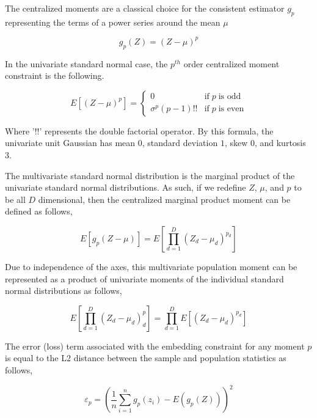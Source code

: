 \documentclass[10pt,twocolumn,letterpaper]{article}
\begin{document}
The centralized moments are a classical choice for the consistent estimator $g_p$ representing the terms of a power series around the mean $\mu$

\begin{equation}
	g_p(Z) = (Z - \mu)^p
\end{equation}

In the univariate standard normal case, the $p^{th}$ order centralized moment constraint is the following.

\begin{equation}
	E\left[ (Z-\mu)^p \right] = 
	\begin{cases} 
		0 &  \text{if} \; p \; \text{is odd} \\
		\sigma^p(p - 1)!! & \text{if} \; p \; \text{is even}
	\end{cases}
\end{equation}

Where '$!!$' represents the double factorial operator.  
By this formula, the univariate unit Gaussian has mean $0$, standard deviation $1$, skew $0$, and kurtosis $3$.

The multivariate standard normal distribution is the marginal product of the univariate standard normal distributions.  As such, if we redefine $Z$, $\mu$, and $p$ to be all $D$ dimensional, then the centralized marginal product moment can be defined as follows,

\begin{equation}
	E\left[g_p(Z - \mu)\right] = E\left[ \prod_{d=1}^D (Z_d - \mu_d)^{p_d} \right]
\end{equation}

Due to independence of the axes, this multivariate population moment can be represented as a product of univariate moments of the individual standard normal distributions as follows,

\begin{equation}
	E\left[ \prod_{d=1}^D (Z_d - \mu_d)^p_d \right] = \prod_{d=1}^D E\left[ (Z_d - \mu_d)^{p_d} \right]
\end{equation}

The error (loss) term associated with the embedding constraint for any moment $p$ is equal to the L2 distance between the sample and population statistics as follows,

\begin{equation}
	\varepsilon_p = \left( \frac{1}{n} \sum_{i=1}^n g_p(z_i) - E(g_p(Z)) \right)^2
\end{equation}
\end{document}
